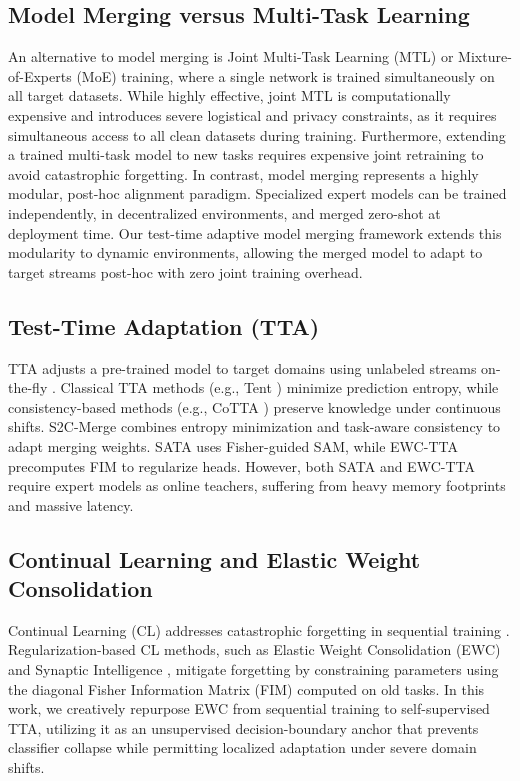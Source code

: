 \documentclass{article}
\theoremstyle{plain}
\theoremstyle{definition}
\theoremstyle{remark}
\begin{document}
\subsection{Model Merging versus Multi-Task Learning}
An alternative to model merging is Joint Multi-Task Learning (MTL) or Mixture-of-Experts (MoE) training, where a single network is trained simultaneously on all target datasets. While highly effective, joint MTL is computationally expensive and introduces severe logistical and privacy constraints, as it requires simultaneous access to all clean datasets during training. Furthermore, extending a trained multi-task model to new tasks requires expensive joint retraining to avoid catastrophic forgetting. In contrast, model merging represents a highly modular, post-hoc alignment paradigm. Specialized expert models can be trained independently, in decentralized environments, and merged zero-shot at deployment time. Our test-time adaptive model merging framework extends this modularity to dynamic environments, allowing the merged model to adapt to target streams post-hoc with zero joint training overhead.

\subsection{Test-Time Adaptation (TTA)}
TTA adjusts a pre-trained model to target domains using unlabeled streams on-the-fly \cite{Wang21,Liang20}. Classical TTA methods (e.g., Tent \cite{wang2021tent}) minimize prediction entropy, while consistency-based methods (e.g., CoTTA \cite{wang2022continual}) preserve knowledge under continuous shifts. S2C-Merge \cite{S2C26} combines entropy minimization and task-aware consistency to adapt merging weights. SATA \cite{Sata26} uses Fisher-guided SAM, while EWC-TTA \cite{Ewc26} precomputes FIM to regularize heads. However, both SATA and EWC-TTA require expert models as online teachers, suffering from heavy memory footprints and massive latency.

\subsection{Continual Learning and Elastic Weight Consolidation}
Continual Learning (CL) addresses catastrophic forgetting in sequential training \cite{delange2021continual}. Regularization-based CL methods, such as Elastic Weight Consolidation (EWC) \cite{kirkpatrick2017overcoming} and Synaptic Intelligence \cite{zenke2017continual}, mitigate forgetting by constraining parameters using the diagonal Fisher Information Matrix (FIM) computed on old tasks. In this work, we creatively repurpose EWC from sequential training to self-supervised TTA, utilizing it as an unsupervised decision-boundary anchor that prevents classifier collapse while permitting localized adaptation under severe domain shifts.
\end{document}
